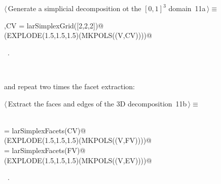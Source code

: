 \documentclass[11pt,oneside]{article}	%
\begin{document}
\begin{flushleft} \small
\begin{minipage}{\linewidth} \label{scrap14}
\protect{}$\langle\,$Generate a simplicial decomposition ot the $[0,1]^3$ domain\nobreak\ {\footnotesize 11a}$\,\rangle\equiv$
\vspace{-1ex}
\begin{list}{}{} \item
\mbox{}\verb@V,CV = larSimplexGrid([2,2,2])@\\
\mbox{}\verb@VIEW(EXPLODE(1.5,1.5,1.5)(MKPOLS((V,CV))))@\\
\mbox{}\verb@@{\NWsep}
\end{list}
\vspace{-1ex}
\footnotesize\addtolength{\baselineskip}{-1ex}
\begin{list}{}{\setlength{\itemsep}{-\parsep}\setlength{\itemindent}{-\leftmargin}}
\item \NWtxtMacroRefIn\ .
\end{list}
\end{minipage}\\[4ex]
\end{flushleft}

and repeat two times the facet extraction:

\begin{flushleft} \small
\begin{minipage}{\linewidth} \label{scrap15}
\protect{}$\langle\,$Extract the faces and edges of the 3D decomposition\nobreak\ {\footnotesize 11b}$\,\rangle\equiv$
\vspace{-1ex}
\begin{list}{}{} \item
\mbox{}\verb@@\\
\mbox{}\verb@FV = larSimplexFacets(CV)@\\
\mbox{}\verb@VIEW(EXPLODE(1.5,1.5,1.5)(MKPOLS((V,FV))))@\\
\mbox{}\verb@EV = larSimplexFacets(FV)@\\
\mbox{}\verb@VIEW(EXPLODE(1.5,1.5,1.5)(MKPOLS((V,EV))))@\\
\mbox{}\verb@@{\NWsep}
\end{list}
\vspace{-1ex}
\footnotesize\addtolength{\baselineskip}{-1ex}
\begin{list}{}{\setlength{\itemsep}{-\parsep}\setlength{\itemindent}{-\leftmargin}}
\item \NWtxtMacroRefIn\ .
\end{list}
\end{minipage}\\[4ex]
\end{flushleft}
\end{document}
